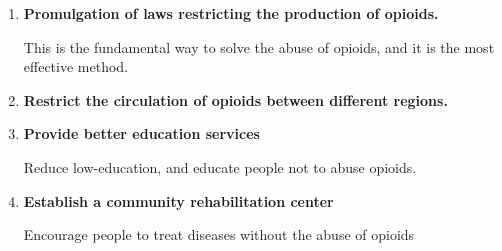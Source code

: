 \documentclass[12pt]{mcmthesis}
\begin{document}
\begin{enumerate}
  \item  \textbf{Promulgation of laws restricting the production of opioids.}\par This is the fundamental way to solve the abuse of opioids, and it is the most effective method.
  \item \textbf{Restrict the circulation of opioids between different regions.}
  \item \textbf{Provide better education services}\par Reduce low-education, and educate people not to abuse opioids.
  \item \textbf{Establish a community rehabilitation center}\par Encourage people to treat diseases without the abuse of opioids
\end{enumerate}
\end{document}
